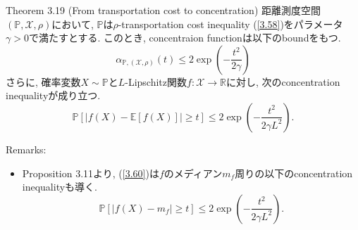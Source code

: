 \documentclass[aspectratio=169, dvipdfmx]{beamer}
\newcommand{\ex}{\mathbb{E}}
\newcommand{\bb}{\mathbb}
\newcommand{\cc}{\mathcal}
\begin{document}
\begin{frame}
\begin{block}{Theorem 3.19 (From transportation cost to concentration)}
距離測度空間$(\bb{P},\cc{X},\rho)$において,
$\bb{P}$は$\rho$-transportation cost inequality (\ref{3.58})をパラメータ$\gamma>0$で満たすとする.
このとき, concentraion functionは以下のboundをもつ.
\[
    \alpha_{\bb{P}, (\cc{X},\rho)}(t)
    \le 2 \exp\left(-\frac{t^2}{2\gamma}\right)
    \tag{3.60}\label{3.60}
\]
さらに, 確率変数$X\sim \bb{P}$と$L$-Lipschitz関数$f:\cc{X}\to\bb{R}$に対し,
次のconcentration inequalityが成り立つ.
\[
    \bb{P}\left[ |f(X) - \ex[f(X)]| \ge t\right]
    \le 2 \exp\left( -\frac{t^2}{2\gamma L^2} \right).
    \tag{3.61}\label{3.61}
\]
\end{block}
{Remarks:}
\begin{itemize}
    \item Proposition 3.11より,
        (\ref{3.60})は$f$のメディアン$m_f$周りの以下のconcentration inequalityも導く.
        \[
            \bb{P}\left[ |f(X) - m_f| \ge t\right]
            \le 2 \exp\left( -\frac{t^2}{2\gamma L^2} \right).
            \tag{3.62}\label{3.62}
        \]
\end{itemize}
\end{frame}
\end{document}
